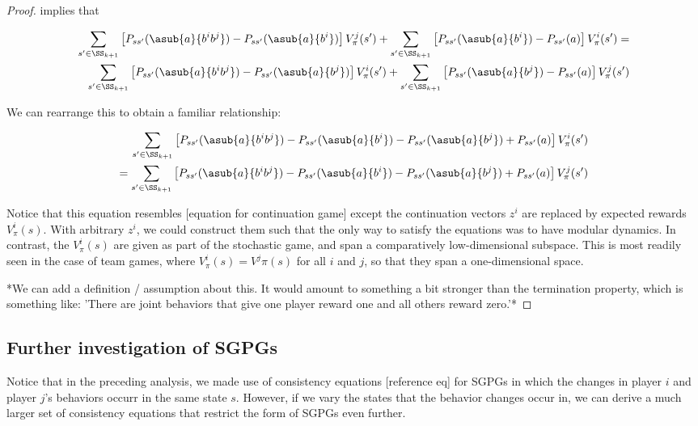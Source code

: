 \begin{proof}
implies that

\begin{align*}
\sum_{s' \in \SS_{k+1}} \left[P_{ss'}(\asub{a}{b^ib^j}) - P_{ss'}(\asub{a}{b^i})\right] V^j_{\pi}(s') + \sum_{s' \in \SS_{k+1}} \left[P_{ss'}(\asub{a}{b^i}) - P_{ss'}(a)\right] V^i_{\pi}(s') = \\
\sum_{s' \in \SS_{k+1}} \left[P_{ss'}(\asub{a}{b^ib^j}) - P_{ss'}(\asub{a}{b^j})\right] V^i_{\pi}(s') + \sum_{s' \in \SS_{k+1}} \left[P_{ss'}(\asub{a}{b^j}) - P_{ss'}(a)\right] V^j_{\pi}(s')
\end{align*}

We can rearrange this to obtain a familiar relationship:

\begin{align*}
\sum_{s' \in \SS_{k+1}} \left[P_{ss'}(\asub{a}{b^ib^j})- P_{ss'}(\asub{a}{b^i}) - P_{ss'}(\asub{a}{b^j}) +  P_{ss'}(a)\right] V^i_{\pi}(s') \\
= \sum_{s' \in \SS_{k+1}} \left[P_{ss'}(\asub{a}{b^ib^j}) - P_{ss'}(\asub{a}{b^i}) - P_{ss'}(\asub{a}{b^j}) +  P_{ss'}(a)\right] V^j_{\pi}(s')
\end{align*}


Notice that this equation resembles [equation for continuation game] except the continuation vectors $z^i$ are replaced by expected rewards $V^i_{\pi}(s)$. With arbitrary $z^i$, we could construct them such that the only way to satisfy the equations was to have modular dynamics. In contrast, the $V^i_{\pi}(s)$ are given as part of the stochastic game, and span a comparatively low-dimensional subspace. This is most readily seen in the case of team games, where $V^i_{\pi}(s) = V^j{\pi}(s)$ for all $i$ and $j$, so that they span a one-dimensional space. 

*We can add a definition / assumption about this. It would amount to something a bit stronger than the termination property, which is something like: 'There are joint behaviors that give one player reward one and all others reward zero.'*

\end{proof}

\subsection{Further investigation of SGPGs}

Notice that in the preceding analysis, we made use of consistency equations [reference eq] for SGPGs in which the changes in player $i$ and player $j$'s behaviors occurr in the same state $s$. However, if we vary the states that the behavior changes occur in, we can derive a much larger set of consistency equations that restrict the form of SGPGs even further. 

